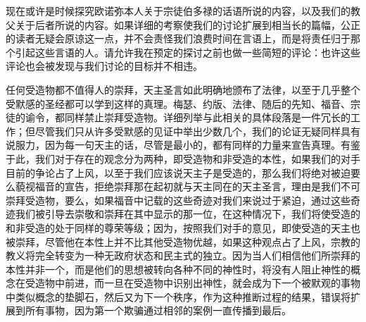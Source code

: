 现在或许是时候探究欧诺弥本人关于宗徒伯多禄的话语所说的内容，以及我们的教父关于后者所说的内容。如果详细的考察使我们的讨论扩展到相当长的篇幅，公正的读者无疑会原谅这一点，并不会责怪我们浪费时间在言语上，而是将责任归于那个引起这些言语的人。请允许我在预定的探讨之前也做一些简短的评论：也许这些评论也会被发现与我们讨论的目标并不相违。\par

任何受造物都不值得人的崇拜，天主圣言如此明确地颁布了法律，以至于几乎整个受默感的圣经都可以学到这样的真理。梅瑟、约版、法律、随后的先知、福音、宗徒的谕令，都同样禁止崇拜受造物。详细列举与此相关的具体段落是一件冗长的工作；但尽管我们只从许多受默感的见证中举出少数几个，我们的论证无疑同样具有说服力，因为每一句天主的话，尽管是最小的，都有同样的力量来宣告真理。有鉴于此，我们对于存在的观念分为两种，即受造物和非受造的本性，如果我们的对手目前的争论占了上风，以至于我们应该说天主子是受造的，那么我们将绝对被迫要么藐视福音的宣告，拒绝崇拜那在起初就与天主同在的天主圣言，理由是我们不可崇拜受造物，要么，如果福音中记载的这些奇迹对我们来说过于紧迫，通过这些奇迹我们被引导去崇敬和崇拜在其中显示的那一位，在这种情况下，我们将使受造的和非受造的处于同样的尊荣等级；因为，按照我们对手的意见，即使受造的天主也被崇拜，尽管他在本性上并不比其他受造物优越，如果这种观点占了上风，宗教的教义将完全转变为一种无政府状态和民主式的独立。因为当人们相信他们所崇拜的本性并非一个，而是他们的思想被转向各种不同的神性时，将没有人阻止神性的概念在受造物中前进，而一旦在受造物中识别出神性，就会成为下一个被默观的事物中类似概念的垫脚石，然后又为下一个秩序，作为这种推断过程的结果，错误将扩展到所有事物，因为第一个欺骗通过相邻的案例一直传播到最后。\par

